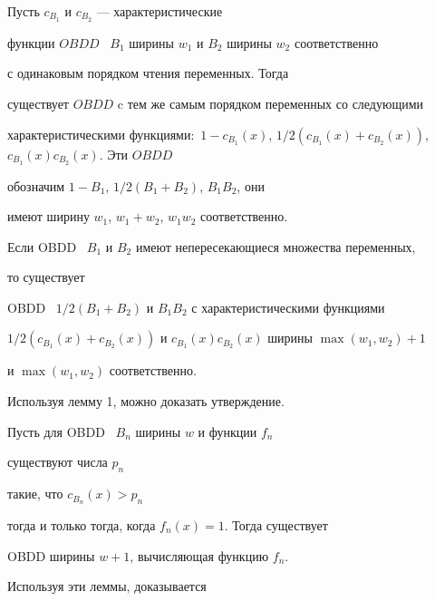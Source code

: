 \begin{lem}


Пусть $c_{B_1}$ и $c_{B_2}$ --- характеристические 


функции $OBDD$ \ $B_1$ ширины $w_1$ и $B_2$ ширины $w_2$ соответственно


с одинаковым порядком чтения переменных. Тогда


существует $OBDD$ c тем же самым порядком переменных со следующими


характеристическими функциями\/${:}$ $1-c_{B_1}(x)$, $1/2


(c_{B_1}(x)+c_{B_2}(x))$, $c_{B_1}(x)c_{B_2}(x)$. Эти $OBDD$


обозначим $1-B_1$, $1/2(B_1+B_2)$, $B_1B_2$, они


имеют ширину $w_1$, $w_1+w_2$, $w_1w_2$ соответственно.





Если OBDD \ $B_1$ и $B_2$ имеют непересекающиеся множества переменных,


то существует


OBDD \ $1/2(B_1+B_2)$ и $B_1B_2$ с характеристическими функциями


$1/2(c_{B_1}(x)+c_{B_2}(x))$ и $c_{B_1}(x)c_{B_2}(x)$ ширины $\max(w_1,w_2)+1$


и $\max(w_1,w_2)$ соответственно.


\end{lem}





Используя лемму 1, можно доказать утверждение.








\begin{lem}


Пусть для OBDD \ $B_n$ ширины $w$ и функции $f_n$


существуют числа $p_n$


такие, что $c_{B_n}(x)>p_n$


тогда и только тогда, когда $f_n(x)=1$. Тогда существует


OBDD ширины $w+1$, вычисляющая функцию $f_n$.


\end{lem}





Используя эти леммы, доказывается








